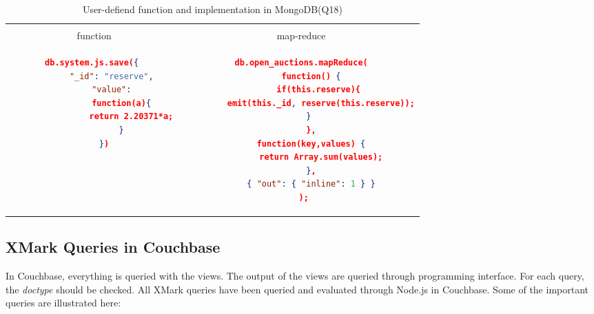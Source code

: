 \begin{longtable}{c|c}
    \hline
	\caption{ User-defiend function and implementation in MongoDB(Q18)}
	\label{tbl:mongodb-q18}\\
    {function } & {map-reduce}\\
	\hline
\begin{minipage}{.4\textwidth}
\begin{lstlisting}[language=JSON,basicstyle =\scriptsize]
    db.system.js.save({ 
        "_id": "reserve", 
        "value": 
            function(a){ 
                return 2.20371*a; 
            } 
    })
\end{lstlisting}
\end{minipage} &
\begin{minipage}{.4\textwidth}
\begin{lstlisting}[language=JSON,basicstyle =\scriptsize]
db.open_auctions.mapReduce(
    function() {
       if(this.reserve){
        emit(this._id, reserve(this.reserve));
       }    
    },
    function(key,values) {
        return Array.sum(values);
    },
    { "out": { "inline": 1 } }
 );
\end{lstlisting}
\end{minipage}
\end{longtable}


\subsection{XMark Queries in Couchbase}
 In Couchbase, everything is queried with the views. The output of the views are queried through programming interface. For each query, the \textit{doctype} should be checked.  All XMark queries have been queried and evaluated through Node.js in Couchbase. Some of the important queries are illustrated here:
 
